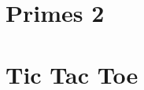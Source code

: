 \section{Primes 2} \label{sec:appendix:testsuite:primes2}
\begin{lstfloat}[H]
    
\caption{primes2.bf, \cite{primes2}}
\label{lst:primes2}
\end{lstfloat}

\section{Tic Tac Toe} \label{sec:appendix:testsuite:tictactoe}
\begin{lstfloat}[H]

\caption{tictactoe.bf, \cite{tictactoe}}
\label{lst:tictactoe}
\end{lstfloat}



